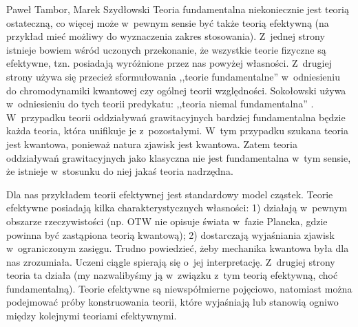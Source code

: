 \begin{artplenv2auth}{Paweł Tambor, Marek Szydłowski}
Teoria fundamentalna niekoniecznie jest teorią ostateczną, co więcej może w~pewnym sensie być także teorią efektywną (na przykład mieć możliwy do wyznaczenia zakres stosowania). Z~jednej strony istnieje bowiem wśród uczonych przekonanie, że wszystkie teorie fizyczne są efektywne, tzn. posiadają wyróżnione przez nas powyżej własności. Z~drugiej strony używa się przecież sformułowania ,,teorie fundamentalne'' w~odniesieniu do chromodynamiki kwantowej czy ogólnej teorii względności. Sokołowski używa w~odniesieniu do tych teorii predykatu: ,,teoria niemal fundamentalna''
\parencite[][s.~122]{sokolowski_teorie_2006}. %
 W~przypadku teorii oddziaływań grawitacyjnych bardziej fundamentalna będzie każda teoria, która unifikuje je z~pozostałymi. W~tym przypadku szukana teoria jest kwantowa, ponieważ natura zjawisk jest kwantowa. Zatem teoria oddziaływań grawitacyjnych jako klasyczna nie jest fundamentalna w~tym sensie, że istnieje w~stosunku do niej jakaś teoria nadrzędna.

Dla nas przykładem teorii efektywnej jest standardowy model cząstek. Teorie efektywne posiadają kilka charakterystycznych własności: 1) działają w~pewnym obszarze rzeczywistości (np. OTW nie opisuje świata w~fazie Plancka, gdzie powinna być zastąpiona teorią kwantową); 2) dostarczają wyjaśniania zjawisk w~ograniczonym zasięgu. Trudno powiedzieć, żeby mechanika kwantowa była dla nas zrozumiała. Uczeni ciągle spierają się o~jej interpretację. Z~drugiej strony teoria ta działa (my nazwalibyśmy ją w~związku z~tym teorią efektywną, choć fundamentalną). Teorie efektywne są niewspółmierne pojęciowo, natomiast można podejmować próby konstruowania teorii, które wyjaśniają lub stanowią ogniwo między kolejnymi teoriami efektywnymi.


\end{artplenv2auth}

